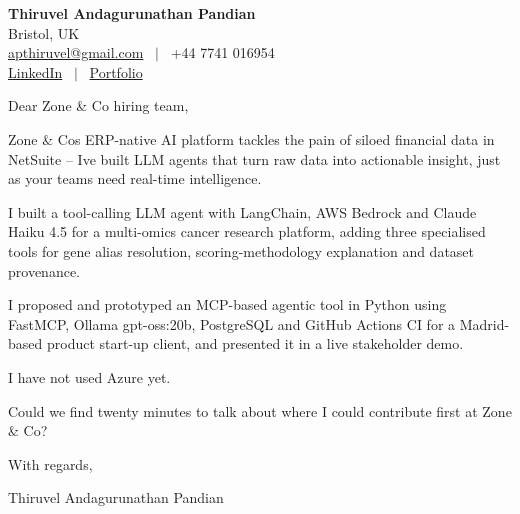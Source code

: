 \documentclass[11pt,a4paper]{article}
\begin{document}
\raggedright
\pagestyle{empty}

\begin{center}
    {\LARGE \color{linkblue} \textbf{Thiruvel Andagurunathan Pandian}}\\[0.2cm]
    Bristol, UK \\
    \href{mailto:apthiruvel@gmail.com}{apthiruvel@gmail.com} \ $|$ \ +44 7741 016954 \\
\href{https://www.linkedin.com/in/thiruvel-a-p/}{LinkedIn} \ $|$ \ \href{https://thiruvel-ap.github.io/PersonalPortfolio/}{Portfolio}
\end{center}

\vspace{0.4cm}

\noindent
Dear Zone \& Co hiring team,

Zone \& Co\textquotesingle{}s ERP-native AI platform tackles the pain of siloed financial data in NetSuite – I\textquotesingle{}ve built LLM agents that turn raw data into actionable insight, just as your teams need real-time intelligence.

I built a tool-calling LLM agent with LangChain, AWS Bedrock and Claude Haiku 4.5 for a multi-omics cancer research platform, adding three specialised tools for gene alias resolution, scoring-methodology explanation and dataset provenance.

I proposed and prototyped an MCP-based agentic tool in Python using FastMCP, Ollama gpt-oss:20b, PostgreSQL and GitHub Actions CI for a Madrid-based product start-up client, and presented it in a live stakeholder demo.

I have not used Azure yet.

Could we find twenty minutes to talk about where I could contribute first at Zone \& Co?

\vspace{0.5cm}

With regards,

Thiruvel Andagurunathan Pandian
\end{document}
